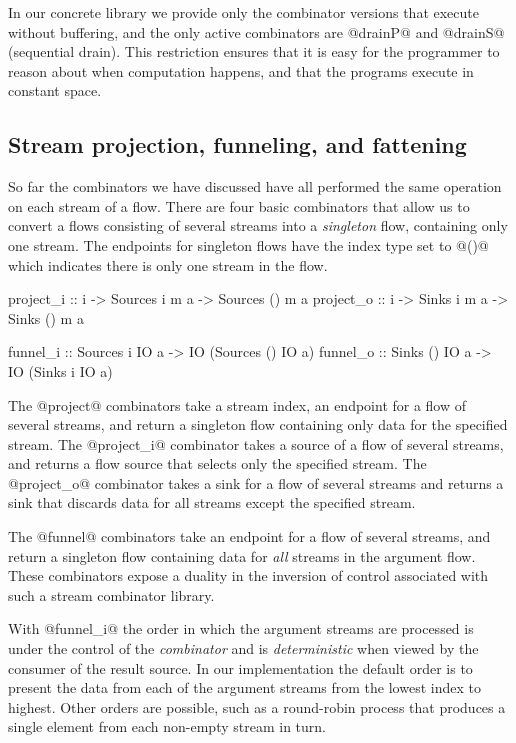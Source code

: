 In our concrete library we provide only the combinator versions that execute without buffering, and the only active combinators are @drainP@ and @drainS@ (sequential drain). This restriction ensures that it is easy for the programmer to reason about when computation happens, and that the programs execute in constant space.


\subsection{Stream projection, funneling, and fattening}
So far the combinators we have discussed have all performed the same operation on each stream of a flow. There are four basic combinators that allow us to convert a flows consisting of several streams into a \emph{singleton} flow, containing only one stream. The endpoints for singleton flows have the index type set to @()@ which indicates there is only one stream in the flow.
\begin{code}
project_i :: i -> Sources i m a -> Sources () m a
project_o :: i -> Sinks   i m a -> Sinks   () m a

funnel_i  :: Sources i IO a -> IO (Sources () IO a)
funnel_o  :: Sinks  () IO a -> IO (Sinks   i  IO a)
\end{code}

The @project@ combinators take a stream index, an endpoint for a flow of several streams, and return a singleton flow containing only data for the specified stream. The @project_i@ combinator takes a source of a flow of several streams, and returns a flow source that selects only the specified stream. The @project_o@ combinator takes a sink for a flow of several streams and returns a sink that discards data for all streams except the specified stream.

The @funnel@ combinators take an endpoint for a flow of several streams, and return a singleton flow containing data for \emph{all} streams in the argument flow. These combinators expose a duality in the inversion of control associated with such a stream combinator library. 

With @funnel_i@ the order in which the argument streams are processed is under the control of the \emph{combinator} and is \emph{deterministic} when viewed by the consumer of the result source. In our implementation the default order is to present the data from each of the argument streams from the lowest index to highest. Other orders are possible, such as a round-robin process that produces a single element from each non-empty stream in turn. 


